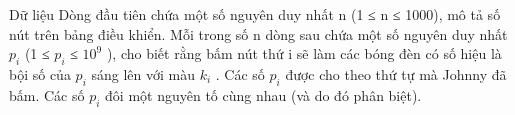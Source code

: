 Dữ liệu
Dòng đầu tiên chứa một số nguyên duy nhất n (1 ≤ n ≤ 1000), mô tả số nút trên bảng điều khiển. Mỗi trong số n dòng sau chứa một số nguyên duy nhất $p_{i}$   (1 ≤ $p_{i}$   ≤ $10^{9}$   ), cho biết rằng bấm nút thứ i sẽ làm các bóng đèn có số hiệu là bội số của $p_{i}$   sáng lên với màu $k_{i}$   . Các số $p_{i}$   được cho theo thứ tự mà Johnny đã bấm. Các số $p_{i}$   đôi một nguyên tố cùng nhau (và do đó phân biệt).